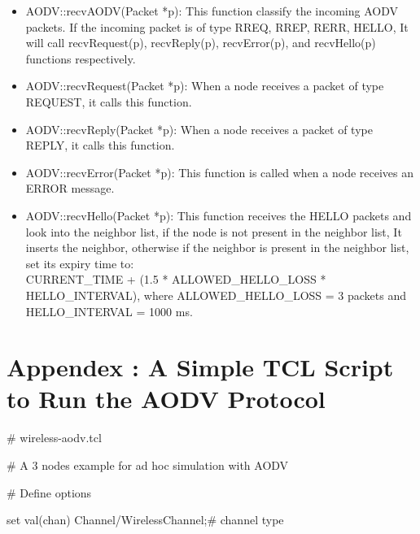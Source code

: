\documentclass[times,10pt,onecolumn]{article}
\begin{document}
\begin{itemize}
\item AODV::recvAODV(Packet *p): This function classify the incoming AODV packets. If the incoming packet is of type RREQ, RREP, RERR, HELLO, It will call recvRequest(p), recvReply(p), recvError(p), and recvHello(p) functions respectively.

\item AODV::recvRequest(Packet *p): When a node receives a packet of type REQUEST, it calls this function.

\item AODV::recvReply(Packet *p): When a node receives a packet of type REPLY, it calls this function.

\item AODV::recvError(Packet *p): This function is called when a node receives an ERROR message.

\item AODV::recvHello(Packet *p): This function receives the HELLO packets and look into the neighbor list, if the node is not present in the neighbor list, It inserts the neighbor, otherwise if the neighbor is present in the neighbor list, set its expiry time to:\\
CURRENT\_TIME + (1.5 * ALLOWED\_HELLO\_LOSS * HELLO\_INTERVAL), where ALLOWED\_HELLO\_LOSS = 3 packets and HELLO\_INTERVAL = 1000 ms.

\end{itemize}

\vspace{20pt}







\vspace{20pt}







\pagebreak
\pagestyle{empty}

\section{Appendex : A Simple TCL Script to Run the AODV Protocol}
\label{sec:tcl}

\# wireless-aodv.tcl

\# A 3 nodes example for ad hoc simulation with AODV

\# Define options

set val(chan)    \hspace{20pt}       Channel/WirelessChannel;\# channel type
\end{document}

